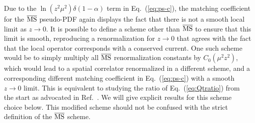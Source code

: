 \documentclass[prd,aps,twocolumn,preprintnumbers,showpacs,nofootinbib,superscriptaddress,notitlepage]{revtex4-1}
\newcommand{\spcorr}{spatial correlator\xspace}
\DeclareRobustCommand{\eq}[1]{Eq.~(\ref{eq:#1})}
\begin{document}
\begin{widetext}
Due to the $\ln(z^2\mu^2)\delta(1-\alpha)$ term in \eq{ps-c}, the matching coefficient for the $\overline{\rm MS}$ pseudo-PDF again displays the fact that there is not a smooth local limit as $z\to 0$.  It is possible to define a scheme other than $\overline{\rm MS}$ to ensure that this limit is smooth, reproducing a renormalization for $z\to 0$ that agrees with the fact that the local operator corresponds with a conserved current. One such scheme would be to simply multiply all $\overline{\rm MS}$ renormalization constants by $C_0(\mu^2 z^2)$, which would lead to a   \spcorr renormalized in a different scheme, and a corresponding different matching coefficient in \eq{ps-c} with a smooth $z\to 0$ limit. This is equivalent to studying the ratio of \eq{Qtratio} from the start as advocated in Ref.~\cite{Radyushkin:2017cyf,Radyushkin:2017lvu}. We will give explicit results for this scheme choice below. This modified scheme should not be confused with the strict definition of the $\overline{\rm MS}$ scheme.



\end{widetext}
\end{document}
